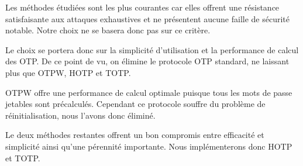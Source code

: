 	Les méthodes étudiées sont les plus courantes car elles offrent une
	résistance satisfaisante aux attaques exhaustives et ne présentent aucune
	faille de sécurité notable. Notre choix ne se basera donc pas sur ce
	critère.

	Le choix se portera donc sur la simplicité d'utilisation et la performance
	de calcul des OTP. De ce point de vu, on élimine le protocole OTP
	standard, ne laissant plus que OTPW, HOTP et TOTP.

	OTPW offre une performance de calcul optimale puisque tous les mots de
	passe jetables sont précalculés. Cependant ce protocole souffre du
	problème de réinitialisation, nous l'avons donc éliminé.

	Le deux méthodes restantes offrent un bon compromis entre efficacité et
	simplicité ainsi qu'une pérennité importante. Nous implémenterons donc HOTP
	et TOTP.

